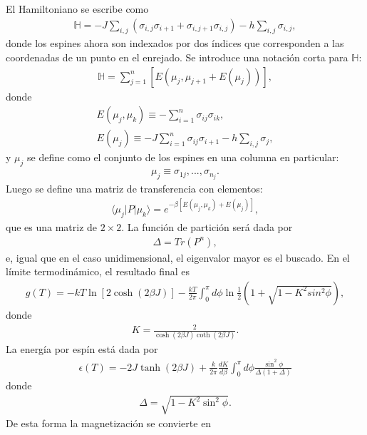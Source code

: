 \documentclass[letterpaper,12pt,oneside]{book}
\begin{document}
El Hamiltoniano se escribe como 
\begin{eqnarray}
\mathbb{H}= -J \sum_{i,j} (\sigma_{i,j}\sigma_{i+1}+\sigma_{i,j+1}\sigma_{i,j}) - h \sum_{i,j}\sigma_{i,j},
\end{eqnarray}
donde los espines ahora son indexados por dos \'indices que corresponden a las coordenadas de un punto en el enrejado. Se introduce una notaci\'on corta para $\mathbb{H}$:
%
\begin{eqnarray}
\mathbb{H}=\sum_{j=1}^{n}[E(\mu_j,\mu_{j+1} + E(\mu_j))], 
\end{eqnarray}
%
donde
%
\begin{eqnarray}
E(\mu_j,\mu_k)\equiv-\sum_{i=1}^{n}\sigma_{ij}\sigma_{ik},\\ 
E(\mu_j)\equiv-J\sum_{i=1}^{n}\sigma_{ij}\sigma_{i+1}-h\sum_{i,j}\sigma_{j},
\end{eqnarray}
%
y $\mu_j$ se define como el conjunto de los espines en una columna en particular:
%
\begin{eqnarray}
\mu_j \equiv {\sigma_{1j},...,\sigma_{n_j}}.
\end{eqnarray}
%
Luego se define una matriz de transferencia con elementos:
% 
\begin{eqnarray}
\langle \mu_j |P| \mu_k\rangle = e^{-\beta [E(\mu_j,\mu_k)+E(\mu_j)]},
\end{eqnarray}
%
que es una matriz de $2\times2$. La funci\'on de partici\'on ser\'a dada por
% 
\begin{eqnarray}
\Delta = Tr(P^n),
\end{eqnarray}
%
e, igual que en el caso unidimensional, el eigenvalor mayor es el buscado. 
En el l\'imite termodin\'amico, el resultado final es
%
\begin{eqnarray}
g(T)=-kT\ln[2\cosh(2\beta J)]  - \frac{kT}{2\pi}\int_{0}^{\pi}d\phi \ln\frac{1}{2}\left (1 + \sqrt{1-K^2sin^2\phi} \right),
\end{eqnarray}
%
donde
%
\begin{eqnarray}
K=\frac{2}{\cosh(2\beta J)\coth(2\beta J)}.
\end{eqnarray}
%
La energía por esp\'in está dada por
% 
\begin{eqnarray}
\epsilon (T)=-2J\tanh(2 \beta J) + \frac{k}{2 \pi}\frac{dK}{d\beta}\int_{0}^{\pi}d\phi\frac{\sin^2\phi}{\Delta(1+\Delta)}
\end{eqnarray}
%
donde 
%
\begin{eqnarray}
\Delta = \sqrt{1-K^2\sin^2\phi}.
\end{eqnarray}
%
De esta forma la magnetizaci\'on se convierte en
\end{document}
